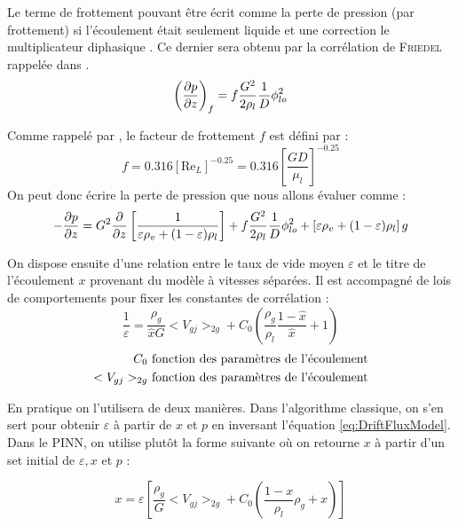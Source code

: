 Le terme de frottement pouvant être écrit comme la perte de pression (par frottement) si l'écoulement était seulement liquide et une correction le \og multiplicateur diphasique \fg{}. Ce dernier sera obtenu par la corrélation de \textsc{Friedel} rappelée dans \cite{revellinAdiabaticTwophaseFrictional2007}.
\begin{equation}
    \left(\pder[p]{z} \right)_{f} = f\frac{G^2}{2 \rho_l}\frac{1}{D} \phi_{lo}^2
\end{equation}

Comme rappelé par \cite{revellinAdiabaticTwophaseFrictional2007}, le facteur de frottement $f$ est défini par :
\begin{equation}
    f = 0.316 \left[\text{Re}_L\right]^{-0.25} = 0.316 \left[\frac{G D}{\mu_l}\right]^{-0.25} 
\end{equation}
On peut donc écrire la perte de pression que nous allons évaluer comme :
\begin{equation}
     -\pder[p]{z} = G^2\pder{z}\left[\frac{1}{\varepsilon \rho_v + (1-\varepsilon)\rho_l } \right] + f\frac{G^2}{2 \rho_l}\frac{1}{D} \phi_{lo}^2 + \left[ \varepsilon \rho_v + (1-\varepsilon)\rho_l  \right] g
\end{equation}


On dispose ensuite d'une relation entre le taux de vide moyen $\varepsilon$ et le titre de l'écoulement $x$ provenant du modèle à vitesses séparées. Il est accompagné de lois de comportements pour fixer les constantes de corrélation :
\begin{equation}
        \frac{1}{\varepsilon} = \frac{\rho_g}{\hat{x} G} <V_{gj}>_{2g} + C_0\left(\frac{\rho_g}{\rho_l}\frac{1-\hat{x}}{\hat{x}} + 1\right) 
\label{eq:DriftFluxModel}
\end{equation}
\begin{align*}
         C_0 &\textnormal{ fonction des paramètres de l'écoulement}\\
        <V_{gj}>_{2g} &\textnormal{ fonction des paramètres de l'écoulement}   
\end{align*}

En pratique on l'utilisera de deux manières. Dans l'algorithme classique, on s'en sert pour obtenir $\varepsilon$ à partir de $x$ et $p$ en inversant l'équation \ref{eq:DriftFluxModel}. Dans le PINN, on utilise plutôt la forme suivante où on retourne $x$ à partir d'un set initial de $\varepsilon,x$ et $p$ :

\begin{equation}
    x = \varepsilon \left[ \frac{\rho_g}{G}<V_{gj}>_{2g} + C_0 \left( \frac{1-x}{\rho_l}\rho_g + x\right) \right]
\end{equation}

